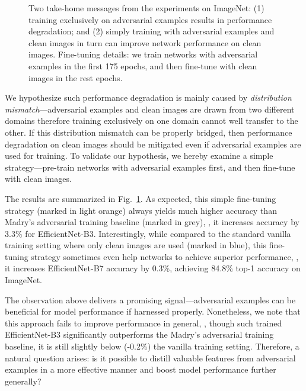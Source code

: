 \documentclass[10pt,twocolumn,letterpaper]{article}
\begin{document}
\begin{figure}[t!]
\centering
{}
\caption{Two take-home messages from the experiments on ImageNet: (1) training exclusively on adversarial examples results in performance degradation; and (2) simply training with adversarial examples and clean images in turn can improve network performance on clean images. Fine-tuning details: we train networks with adversarial examples in the first 175 epochs, and then fine-tune with clean images in the rest epochs.}
\label{fig:motivation} 
\vspace{-1.1em}
\end{figure}



We hypothesize such performance degradation is mainly caused by \emph{distribution mismatch}---adversarial examples and clean images are drawn from two different domains therefore training exclusively on one domain cannot well transfer to the other. If this distribution mismatch can be properly bridged, then performance degradation on clean images should be mitigated even if adversarial examples are used for training. 
To validate our hypothesis, we hereby examine a simple strategy---pre-train networks with adversarial examples first, and then fine-tune with clean images. 


The results are summarized in Fig.~\ref{fig:motivation}. As expected, this simple fine-tuning strategy (marked in light orange) always yields much higher accuracy than Madry's adversarial training baseline  (marked in grey), \eg, it increases accuracy by 3.3\% for EfficientNet-B3. Interestingly, while compared to the standard vanilla training setting where only clean images are used (marked in blue), this fine-tuning strategy sometimes even help networks to achieve superior performance, \eg, it increases EfficientNet-B7 accuracy by 0.3\%, achieving 84.8\% top-1 accuracy on ImageNet.


The observation above delivers a promising signal---adversarial examples can be beneficial for model performance if harnessed properly. Nonetheless, we note that this approach fails to improve performance in general, \eg, though such trained EfficientNet-B3 significantly outperforms the Madry's adversarial training baseline, it is still slightly below (-0.2\%) the vanilla training setting. Therefore, a natural question arises: is it possible to distill valuable features from adversarial examples in a more effective manner and boost model performance further generally?
\end{document}
